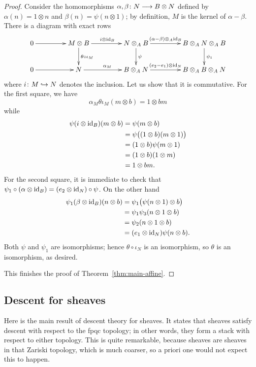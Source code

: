 \begin{4   STACKS}
\begin{4.2 Descent for quasi-coherent sheaves}
\begin{proof}
Consider the homomorphisms $\alpha, \beta\colon N \arr B \otimes N$ defined by $\alpha (n) = 1 \otimes n$ and $\beta(n) = \psi(n \otimes 1)$; by definition, $M$ is the kernel of $\alpha - \beta$. There is a diagram with exact rows
   \[
   \xymatrix@C+20pt{0 \ar[r] &
   M \otimes B
   \ar[r]^{i \otimes \id_B} \ar[d]^{\theta \circ \iota_M} &
   N \otimes_A B \ar[d]^\psi
   \ar[r]^-{(\alpha - \beta)\otimes_A\id_B} &
   B \otimes_A N \otimes_A B \ar[d]^{\psi_1} \\
   0 \ar[r] &
   N \ar[r]^{\alpha_M} &
   B \otimes_A N \ar[r]^-{(e_2 - e_1)\otimes\id_N}&
   B \otimes_A B \otimes_A N \\
   }
   \]
where $i \colon M \hookrightarrow N$ denotes the inclusion. Let us show that it is commutative. For the first square, we have
   \[
   \alpha_M \theta \iota_M(m \otimes b) = 1 \otimes bm
   \]
while
   \begin{align*}
   \psi (i \otimes \mathrm{id}_B)(m \otimes b) &= \psi(m \otimes b) \\
   &{}= \psi\bigl((1 \otimes b)(m \otimes 1)\bigr) \\
   & = (1 \otimes b)\psi(m \otimes 1) \\
   & = (1 \otimes b) (1 \otimes m) \\
   & = 1 \otimes bm.
   \end{align*}
For the second square, it is immediate to check that $\psi_1 \circ (\alpha \otimes\mathrm{id}_B) = (e_2\otimes\mathrm{id}_N) \circ \psi$. On the other hand
   \begin{align*}
   \psi_1 (\beta \otimes \mathrm{id}_B)(n \otimes b)
   & = \psi_1\bigl(\psi(n \otimes 1) \otimes b\bigr) \\
   & = \psi_1 \psi_3 (n \otimes 1 \otimes b) \\
   & = \psi_2(n \otimes 1 \otimes b) \\
   & = (e_1 \otimes\mathrm{id}_N)\psi(n \otimes b).
   \end{align*}
   Both $\psi$ and $\psi_1$ are isomorphisms; hence $\theta \circ \iota_N$ is an isomorphism, so $\theta$ is an isomorphism, as desired.

This finishes the proof of Theorem~\ref{thm:main-affine}.
\end{proof}




\subsection{Descent for \qc sheaves}

Here is the main result of descent theory for \qc sheaves. It states that \qc sheaves satisfy descent with respect to the fpqc topology; in other words, they form a stack with respect to either topology. This is quite remarkable, because \qc sheaves are sheaves in that Zariski topology, which is much coarser, so a priori one would not expect this to happen.


\end{4.2 Descent for quasi-coherent sheaves}
\end{4   STACKS}
